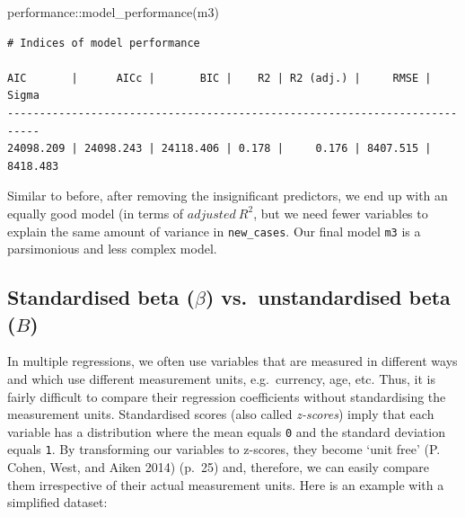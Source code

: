 \documentclass[
  letterpaper,
]{krantz}
\makeatletter
\newenvironment{Shaded}{\begin{snugshade}}{\end{snugshade}}
\newcommand{\FunctionTok}[1]{\textcolor[rgb]{0.28,0.35,0.67}{#1}}
\newcommand{\NormalTok}[1]{\textcolor[rgb]{0.00,0.23,0.31}{#1}}
\newcommand{\SpecialCharTok}[1]{\textcolor[rgb]{0.37,0.37,0.37}{#1}}
\newenvironment{kframe}{%
\medskip{}
\setlength{\fboxsep}{.8em}
 \def\at@end@of@kframe{}%
 \ifinner\ifhmode%
  \def\at@end@of@kframe{\end{minipage}}%
  \begin{minipage}{\columnwidth}%
 \fi\fi%
 \def\FrameCommand##1{\hskip\@totalleftmargin \hskip-\fboxsep
 \colorbox{shadecolor}{##1}\hskip-\fboxsep
     \hskip-\linewidth \hskip-\@totalleftmargin \hskip\columnwidth}%
 \MakeFramed {\advance\hsize-\width
   \@totalleftmargin\z@ \linewidth\hsize
   \@setminipage}}%
 {\par\unskip\endMakeFramed%
 \at@end@of@kframe}
\renewenvironment{Shaded}{\begin{kframe}}{\end{kframe}}
\makeatother
\begin{document}
\begin{Shaded}
\begin{Highlighting}[]
\NormalTok{performance}\SpecialCharTok{::}\FunctionTok{model\_performance}\NormalTok{(m3)}
\end{Highlighting}
\end{Shaded}

\begin{verbatim}
# Indices of model performance

AIC       |      AICc |       BIC |    R2 | R2 (adj.) |     RMSE |    Sigma
---------------------------------------------------------------------------
24098.209 | 24098.243 | 24118.406 | 0.178 |     0.176 | 8407.515 | 8418.483
\end{verbatim}

Similar to before, after removing the insignificant predictors, we end
up with an equally good model (in terms of \(adjusted\ R^2\), but we
need fewer variables to explain the same amount of variance in
\texttt{new\_cases}. Our final model \texttt{m3} is a parsimonious and
less complex model.

\subsection{\texorpdfstring{Standardised beta (\(\beta\))
vs.~unstandardised beta
(\(B\))}{Standardised beta (\textbackslash beta) vs.~unstandardised beta (B)}}\label{sec-standardised-beta-vs-unstandardised-beta}

In multiple regressions, we often use variables that are measured in
different ways and which use different measurement units, e.g.~currency,
age, etc. Thus, it is fairly difficult to compare their regression
coefficients without standardising the measurement units. Standardised
scores (also called \emph{z-scores}) imply that each variable has a
distribution where the mean equals \texttt{0} and the standard deviation
equals \texttt{1}. By transforming our variables to z-scores, they
become `unit free' (P. Cohen, West, and Aiken 2014) (p.~25) and,
therefore, we can easily compare them irrespective of their actual
measurement units. Here is an example with a simplified dataset:
\end{document}
